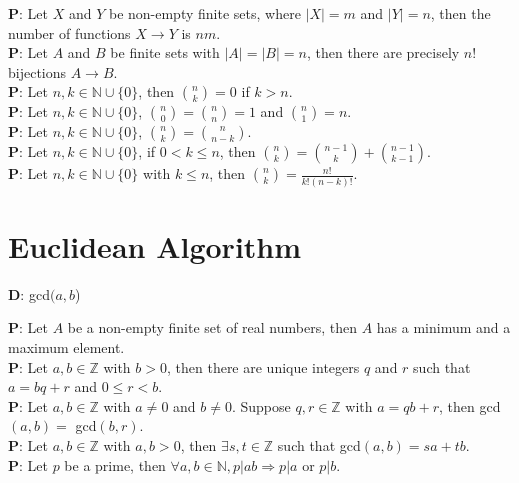 \documentclass[a4paper]{article}
\begin{document}
	\textbf{P}: Let $X$ and $Y$ be non-empty finite sets, where $\vert X \vert = m$ and $\vert Y \vert = n$, then the number of functions $X \rightarrow Y$ is $nm$.\\
	\textbf{P}: Let $A$ and $B$ be finite sets with $\vert A \vert = \vert B \vert = n$, then there are precisely $n!$ bijections $A \rightarrow B$.\\
	\textbf{P}: Let $n, k \in \mathbb{N} \cup \{0\}$, then $\binom{n}{k} = 0$ if $k > n$.\\
	\textbf{P}: Let $n, k \in \mathbb{N} \cup \{0\}$, $\binom{n}{0} = \binom{n}{n} = 1$ and $\binom{n}{1} = n$.\\
	\textbf{P}: Let $n, k \in \mathbb{N} \cup \{0\}$, $\binom{n}{k} = \binom{n}{n-k}$.\\ 
	\textbf{P}: Let $n, k \in \mathbb{N} \cup \{0\}$, if $0 < k \leq n$, then $\binom{n}{k} = \binom{n-1}{k} + \binom{n-1}{k-1}$.\\  
	\textbf{P}: Let $n, k \in \mathbb{N} \cup \{0\}$ with $k \leq n$, then $\binom{n}{k} = \frac{n!}{k!(n-k)!}$.
	
\section*{Euclidean Algorithm}
\begin{multicols}{3}
	\noindent
	\textbf{D}: gcd$(a,b$)\\
\end{multicols}
	\noindent
	\textbf{P}: Let $A$ be a non-empty finite set of real numbers, then $A$ has a minimum and a maximum element.\\
	\textbf{P}: Let $a, b \in \mathbb{Z}$ with $b > 0$, then there are unique integers $q$ and $r$ such that $a = bq + r$ and $0 \leq r < b$.\\
	\textbf{P}: Let $a,b \in \mathbb{Z}$ with $a \neq 0$ and $b \neq 0$. Suppose $q,r \in \mathbb{Z} $ with $ a=qb+r$, then gcd$(a, b) =$ gcd$(b, r)$.\\
	\textbf{P}: Let $a,b \in \mathbb{Z}$ with $a,b > 0$, then $\exists s,t \in \mathbb{Z}$ such that gcd$(a,b) = sa+tb$.\\
	\textbf{P}: Let $p$ be a prime, then $\forall a,b \in \mathbb{N}, p\vert ab \Rightarrow p\vert a$ or $p\vert b$.
	
\end{document}
